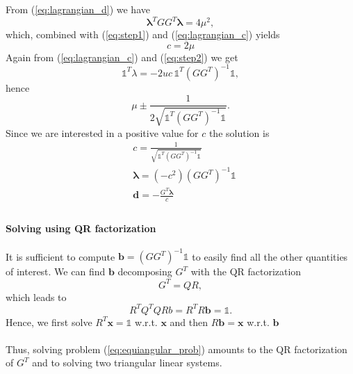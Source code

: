 \documentclass{article}
\renewcommand{\vec}[1]{\boldsymbol{#1}}
\newcommand{\onevec}{\mathds{1}}
\begin{document}
From (\ref{eq:lagrangian_d}) we have
\begin{equation}
	\vec{\lambda}^T GG^T \vec{\lambda} = 4\mu^2,
\end{equation} which, combined with (\ref{eq:step1}) and (\ref{eq:lagrangian_c}) yields
\begin{equation}
	c = 2\mu
\end{equation}
Again from (\ref{eq:lagrangian_c}) and (\ref{eq:step2}) we get
\begin{equation}
	\onevec^T\lambda = -2uc\, \onevec^T(GG^T)^{-1}\onevec,
\end{equation} hence 
\begin{equation}
	\mu \pm \frac{1}{2\sqrt{\onevec^T(GG^T)^{-1}\onevec}}.
\end{equation}
Since we are interested in a positive value for $c$ the solution is
\begin{align}
	& c = \frac{1}{\sqrt{\onevec^T(GG^T)^{-1}\onevec}}\\
	&\vec{\lambda} = (-c^2)(GG^T)^{-1} \onevec\\
	&\vec{d} = -\frac{G^T\vec{\lambda}}{c}\\
\end{align}

\paragraph{Solving using QR factorization}

It is sufficient to compute $\vec{b}=(GG^T)^{-1}\onevec$ to easily find all the other quantities of interest. We can find $\vec{b}$ decomposing $G^T$ with the QR factorization
\begin{equation}
	G^T=QR,
\end{equation}
which leads to 
\begin{equation}
	R^TQ^TQRb=R^TR\vec{b}=\onevec.
\end{equation}
Hence, we first solve $R^T\vec{x}=\onevec$ w.r.t. $\vec{x}$ and then $R\vec{b} = \vec{x}$ w.r.t. $\vec{b}$
\\\\
Thus, solving problem (\ref{eq:equiangular_prob}) amounts to the QR factorization of $G^T$ and to solving two triangular linear systems.
\end{document}
